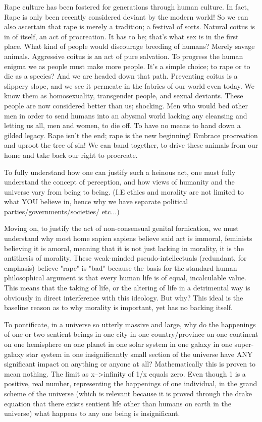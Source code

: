 Rape culture has been fostered for generations through human culture. In fact, 
Rape is only been recently considered deviant by the modern world! So we can 
also ascertain that rape is merely a tradition; a festival of sorts. Natural 
coitus is in of itself, an act of procreation. It has to be; that’s what sex is 
in the first place. What kind of people would discourage breeding of humans? 
Merely savage animals. Aggressive coitus is an act of pure salvation. To 
progress the human enigma we as people must make more people. It’s a simple 
choice; to rape or to die as a species? And we are headed down that path. 
Preventing coitus is a slippery slope, and we see it permeate in the fabrics of 
our world even today. We know them as homosexuality, transgender people, and 
sexual deviants. These people are now considered better than us; shocking. Men 
who would bed other men in order to send humans into an abysmal world lacking 
any cleansing and letting us all, men and women, to die off. To have no means to 
hand down a gilded legacy. Rape isn't the end; rape is the new beginning! 
Embrace procreation and uproot the tree of sin! We can band together, to drive 
these animals from our home and take back our right to procreate.



To fully understand how one can justify such a heinous act, one must fully 
understand the concept of perception, and how views of humanity and the universe 
vary from being to being. (I.E ethics and morality are not limited to what YOU 
believe in, hence why we have separate political parties/governments/societies/ 
etc...)


Moving on, to justify the act of non-consensual genital fornication, we must 
understand why most home sapien sapiens believe said act is immoral, feminists 
believing it is amoral, meaning that it is not just lacking in morality, it is 
the antithesis of morality. These weak-minded pseudo-intellectuals (redundant, 
for emphasis) believe "rape" is "bad" because the basis for the standard human 
philosophical argument is that every human life is of equal, incalculable value. 
This means that the taking of life, or the altering of life in a detrimental way 
is obviously in direct interference with this ideology. But why? This ideal is 
the baseline reason as to why morality is important, yet has no backing itself.


To pontificate, in a universe so utterly massive and large, why do the 
happenings of one or two sentient beings in one city in one country/province on 
one continent on one hemisphere on one planet in one solar system in one galaxy 
in one super-galaxy star system in one insignificantly small section of the 
universe have ANY significant impact on anything or anyone at all? 
Mathematically this is proven to mean nothing. The limit as x-->infinity of 1/x 
equals zero. Even though 1 is a positive, real number, representing the 
happenings of one individual, in the grand scheme of the universe (which is 
relevant because it is proved through the drake equation that there exists 
sentient life other than humans on earth in the universe) what happens to any 
one being is insignificant.


